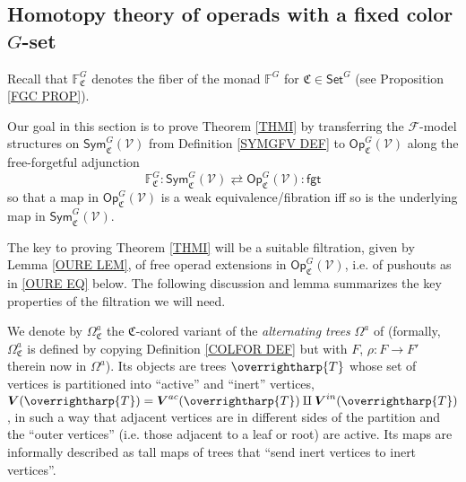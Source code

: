 \documentclass[a4paper,10pt
]{article}%
\numberwithin{equation}{section}
\numberwithin{figure}{section}
\theoremstyle{definition} %
\newcommand{\vect}[1]{\text{\overrightharp{\ensuremath{#1}}}}
\newcommand{\F}{\ensuremath{\mathcal F}}
\newcommand{\V}{\ensuremath{\mathcal V}}
\newcommand{\1}{\ensuremath{\mathbbm 1}}%
\begin{document}
\subsection{Homotopy theory of operads with a fixed color $G$-set}
\label{OPC_MS_SEC}


Recall that $\mathbb{F}^G_{\mathfrak{C}}$
denotes the fiber of the monad $\mathbb{F}^G$
for $\mathfrak{C} \in \mathsf{Set}^G$
(see Proposition \ref{FGC PROP}).

Our goal in this section is to prove 
Theorem \ref{THMI} by transferring the $\F$-model structures on
$\mathsf{Sym}^G_{\mathfrak{C}}(\V)$
from Definition \ref{SYMGFV DEF}
to $\mathsf{Op}^G_{\mathfrak{C}}(\V)$
along the free-forgetful adjunction
\begin{equation}\label{OPAUTADJ EQ}
\mathbb{F}^G_{\mathfrak{C}} \colon
\mathsf{Sym}^G_{\mathfrak{C}}(\V)
\rightleftarrows
\mathsf{Op}^G_{\mathfrak{C}}(\V)
\colon \mathsf{fgt}
\end{equation}
so that a map in $\mathsf{Op}^G_{\mathfrak{C}}(\V)$
is a weak equivalence/fibration iff so is the underlying map in 
$\mathsf{Sym}^G_{\mathfrak{C}}(\V)$.
%


The key to proving Theorem \ref{THMI} will be a suitable filtration,
given by Lemma \ref{OURE LEM},
of free operad extensions in $\mathsf{Op}_{\mathfrak{C}}^G(\V)$,
i.e. of pushouts as in \eqref{OURE EQ} below.
The following discussion and lemma summarizes the key properties of the filtration we will need.

We denote by $\Omega^a_{\mathfrak{C}}$
the $\mathfrak{C}$-colored variant of the 
\emph{alternating trees} $\Omega^a$ of \cite[Def. 5.52]{BP21}
(formally, $\Omega^a_{\mathfrak{C}}$ is defined by copying
Definition \ref{COLFOR DEF} but with 
$F$, $\rho \colon F \to F'$ therein now in $\Omega^a$).
%
Its objects are trees $\vect{T}$ 
whose set of vertices is partitioned into ``active'' and ``inert'' vertices,
$\boldsymbol{V}(\vect T) = 
\boldsymbol{V}^{ac}(\vect T) \amalg \boldsymbol{V}^{in}(\vect T)$,
in such a way that adjacent vertices are in different sides of the partition and the ``outer vertices'' (i.e. those adjacent to a leaf or root) are active.
Its maps are informally described as tall maps of trees that 
``send inert vertices to inert vertices''.
\end{document}

